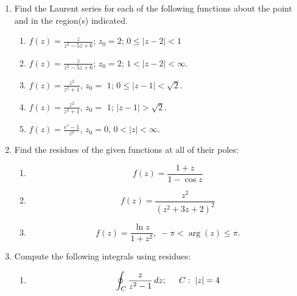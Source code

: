 \documentclass[fleqn]{article}
\begin{document}
\begin{enumerate}
    
    \item Find the Laurent series for each of the following functions about the point and in the region(s) indicated.
    
    \begin{enumerate}
      \item $f\left( z\right) =\frac{\displaystyle z}{\displaystyle z^{2}-5z+6}$; $z_{0}=2$; $0 \leq \left|z-2\right| <1$
      
      \item $f\left( z\right) =\frac{\displaystyle z}{\displaystyle z^{2}-5z+6}$; $z_{0}=2$; $1<\left| z-2\right| <\infty $.
      
      \item $f\left( z\right) =\frac{\displaystyle z^{2}}{\displaystyle z^{2}+1}$, $z_{0}=$ $1$; $0 \leq \left| z-1\right| <\sqrt{2}$.
      
      \item $f\left( z\right) =\frac{\displaystyle z^{2}}{\displaystyle z^{2}+1}$, $z_{0}=$ $1$;  $\left| z-1\right| >\sqrt{2}$.
      
      
      \item $f\left( z\right) =\frac{\displaystyle e^{z}-1}{\displaystyle z^{2}}$, $z_{0}=0$, $0<\left|
      z\right| <\infty $.
    
    
    \end{enumerate}
    
    \item Find the residues of the given functions at all of their poles:
    
    \begin{enumerate}
  
      \item \[
      f\left( z\right) =\frac{1+z}{1-\cos z}
      \]
      
      \item \[
      f\left( z\right) =\frac{z^{2}}{\left( z^{2}+3z+2\right) ^{2}}
      \]
      
      \item \[
      f\left( z\right) =\frac{\ln z}{1+z^{2}},\;-\pi <\arg \left( z\right) \leq \pi.
      \]
    \end{enumerate}
    
    \item Compute the following integrals using residues:
    
    \begin{enumerate}
      \item \[
      \oint_{C}\frac{z}{z^{2}-1}\,dz;\hspace{0.2in}C:\;\left| z\right| =4
      \]
      

\end{enumerate}
\end{enumerate}
\end{document}

